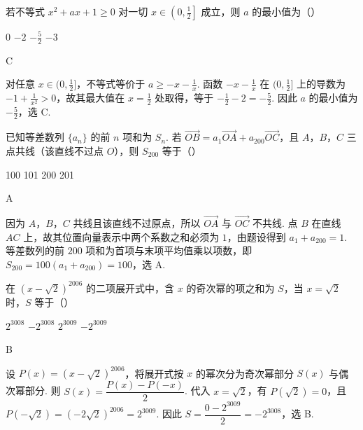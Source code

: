 \begin{problem}
若不等式 \(x^{2} + ax + 1 \geqslant 0\) 对一切 \(x \in \left(0, \frac{1}{2}\right]\) 成立，则 \(a\) 的最小值为（\quad）

\choices
    {0}
    {\(-2\)}
    {\(-\frac{5}{2}\)}
    {\(-3\)}
\end{problem}

\begin{answer}
C
\end{answer}

\begin{solution}
对任意 \(x\in(0,\frac{1}{2}]\)，不等式等价于 \(a\geqslant-x-\frac{1}{x}\). 函数 \(-x-\frac{1}{x}\) 在 \((0,\frac{1}{2}]\) 上的导数为 \(-1+\frac{1}{x^2}>0\)，故其最大值在 \(x=\frac{1}{2}\) 处取得，等于 \(-\frac{1}{2}-2=-\frac{5}{2}\). 因此 \(a\) 的最小值为 \(-\frac{5}{2}\)，选 C.
\end{solution}

\begin{problem}
已知等差数列 \(\{a_{n}\}\) 的前 \(n\) 项和为 \(S_{n}\). 若 \(\overrightarrow{OB} = a_{1}\overrightarrow{OA} + a_{200}\overrightarrow{OC}\)，且 \(A\)，\(B\)，\(C\) 三点共线（该直线不过点 \(O\)），则 \(S_{200}\) 等于（\quad）

\choices
    {100}
    {101}
    {200}
    {201}
\end{problem}

\begin{answer}
A
\end{answer}

\begin{solution}
因为 \(A\)，\(B\)，\(C\) 共线且该直线不过原点，所以 \(\overrightarrow{OA}\) 与 \(\overrightarrow{OC}\) 不共线. 点 \(B\) 在直线 \(AC\) 上，故其位置向量表示中两个系数之和必须为 \(1\)，由题设得到 \(a_1+a_{200}=1\). 等差数列的前 \(200\) 项和为首项与末项平均值乘以项数，即 \(S_{200}=100(a_1+a_{200})=100\)，选 A.
\end{solution}

\begin{problem}
在 \((x - \sqrt{2})^{2006}\) 的二项展开式中，含 \(x\) 的奇次幂的项之和为 \(S\)，当 \(x = \sqrt{2}\) 时，\(S\) 等于（\quad）

\choices
    {\(2^{3008}\)}
    {\(-2^{3008}\)}
    {\(2^{3009}\)}
    {\(-2^{3009}\)}
\end{problem}

\begin{answer}
B
\end{answer}

\begin{solution}
设 \(P(x)=(x-\sqrt{2})^{2006}\)，将展开式按 \(x\) 的幂次分为奇次幂部分 \(S(x)\) 与偶次幂部分. 则 \(S(x)=\dfrac{P(x)-P(-x)}{2}\). 代入 \(x=\sqrt{2}\)，有 \(P(\sqrt{2})=0\)，且 \(P(-\sqrt{2})=(-2\sqrt{2})^{2006}=2^{3009}\). 因此 \(S=\dfrac{0-2^{3009}}{2}=-2^{3008}\)，选 B.
\end{solution}

